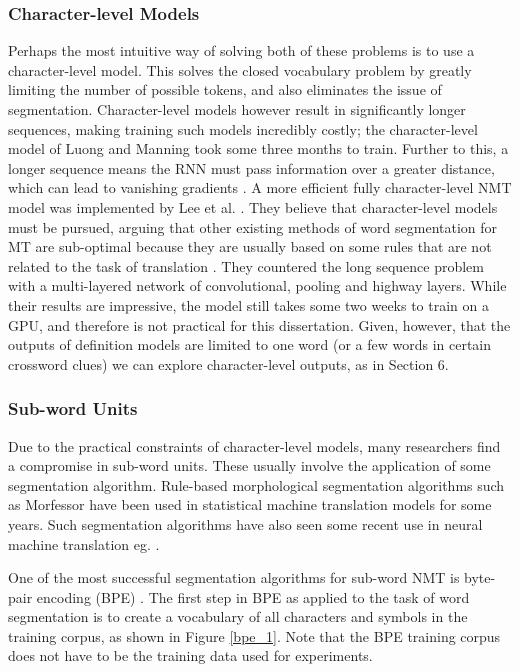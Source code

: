 \documentclass[11pt]{article}
\begin{document}
\begin{spacing}{1}
\subsubsection{Character-level Models}
Perhaps the most intuitive way of solving both of these problems is to use a character-level model. This solves the closed vocabulary problem by greatly limiting the number of possible tokens, and also eliminates the issue of segmentation. Character-level models however result in significantly longer sequences, making training such models incredibly costly; the character-level model of Luong and Manning \citeyear{luong2016achieving} took some three months to train. Further to this, a longer sequence means the RNN must pass information over a greater distance, which can lead to vanishing gradients \cite{sennrich2015neural}. A more efficient fully character-level NMT model was implemented by Lee et al. \citeyear{lee2016fully}. They believe that character-level models must be pursued, arguing that other existing methods of word segmentation for MT are sub-optimal because they are usually based on some rules that are not related to the task of translation \cite{lee2016fully}. They countered the long sequence problem with a multi-layered network of convolutional, pooling and highway layers. While their results are impressive, the model still takes some two weeks to train on a GPU, and therefore is not practical for this dissertation. Given, however, that the outputs of definition models are limited to one word (or a few words in certain crossword clues) we can explore character-level outputs, as in Section 6.

\subsubsection{Sub-word Units}
 
Due to the practical constraints of character-level models, many researchers find a compromise in sub-word units. These usually involve the application of some segmentation algorithm. Rule-based morphological segmentation algorithms such as Morfessor \cite{virpioja2013morfessor} have been used in statistical machine translation models for some years. Such segmentation algorithms have also seen some recent use in neural machine translation eg. \cite{machavcek2018morphological}. 

One of the most successful segmentation algorithms for sub-word NMT is byte-pair encoding (BPE) \cite{sennrich2015neural}. The first step in BPE as applied to the task of word segmentation is to create a vocabulary of all characters and symbols in the training corpus, as shown in Figure \ref{bpe_1}. Note that the BPE training corpus does not have to be the training data used for experiments.


\end{spacing}
\end{document}
